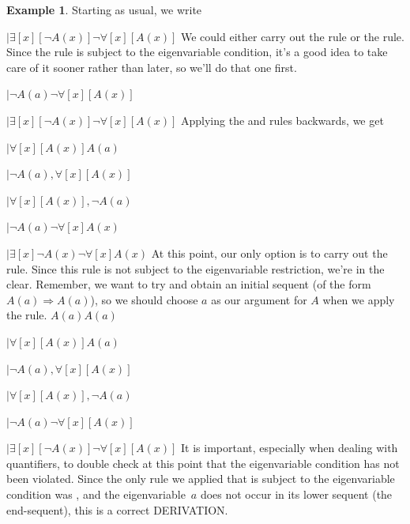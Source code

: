 \documentclass[10pt,a4paper]{article}
\newcommand*{\olup}[1]{\MakeUppercase{#1}}
\theoremstyle{plain}
\theoremstyle{definition}
\newtheorem{ex}[thm]{Example}
\theoremstyle{remark}
\providecommand{\AxiomC}[1]{}
\providecommand{\RightLabel}[1]{}
\providecommand{\fCenter}{}
\newenvironment{prooftree}{}{}
\providecommand{\lforall}{\mathord{\forall}}
\providecommand{\lexists}{\mathord{\exists}}
\providecommand{\Sequent}{\mathrel{\Rightarrow}}
\providecommand{\LeftR}[1]{}
\providecommand{\RightR}[1]{}
\providecommand{\UnaryInf}{\ensuremath{\mid}}
\providecommand{\RightR}{\mathrm{R}}
\providecommand{\LeftR}{\mathrm{L}}
\providecommand{\Axiom}{\mathrm{Ax}}
\begin{document}
\begin{ex}
Starting as usual, we write
\begin{prooftree}
\AxiomC{}
\UnaryInf$\lexists[x][\lnot A(x)] \fCenter \lnot \lforall[x][A(x)]$
\end{prooftree}
We could either carry out the \LeftR{\exists} rule or the \RightR{\lnot}
rule. Since the \LeftR{\exists} rule is subject to the eigenvariable
condition, it's a good idea to take care of it sooner rather than
later, so we'll do that one first.
\begin{prooftree}
\AxiomC{}
\UnaryInf$ \lnot A(a) \fCenter \lnot \lforall[x][A(x)]$
\RightLabel{\LeftR{\lexists}}
\UnaryInf$ \lexists[x][\lnot A(x)] \fCenter \lnot \lforall[x][A(x)]$
\end{prooftree}
Applying the \LeftR{\lnot} and \RightR{\lnot} rules backwards, we get
\begin{prooftree}
\AxiomC{}
\UnaryInf$\lforall[x][A(x)] \fCenter A(a)$
\RightLabel{\LeftR{\lnot}}
\UnaryInf$\lnot A(a), \lforall[x][A(x)] \fCenter $
\RightLabel{\LeftR{\Exchange}}
\UnaryInf$\lforall[x][A(x)], \lnot A(a) \fCenter $
\RightLabel{\RightR{\lnot}}
\UnaryInf$ \lnot A(a) \fCenter \lnot \lforall[x] A(x)$
\RightLabel{\LeftR{\lexists}}
\UnaryInf$ \lexists[x] \lnot A(x) \fCenter \lnot \lforall[x] A(x)$
\end{prooftree}
At this point, our only option is to carry out the \LeftR{\forall}
rule. Since this rule is not subject to the eigenvariable restriction,
we're in the clear. Remember, we want to try and obtain an initial
sequent (of the form $A(a) \Sequent A(a)$), so we should choose $a$
as our argument for $A$ when we apply the rule.
\begin{prooftree}
\Axiom$A(a) \fCenter A(a)$
\RightLabel{\LeftR{\lforall}}
\UnaryInf$\lforall[x][A(x)] \fCenter A(a)$
\RightLabel{\LeftR{\lnot}}
\UnaryInf$\lnot A(a), \lforall[x][A(x)] \fCenter $
\RightLabel{\LeftR{\Exchange}}
\UnaryInf$\lforall[x][A(x)], \lnot A(a) \fCenter $
\RightLabel{\RightR{\lnot}}
\UnaryInf$ \lnot A(a) \fCenter \lnot \lforall[x][A(x)]$
\RightLabel{\LeftR{\lexists}}
\UnaryInf$ \lexists[x][ \lnot A(x)] \fCenter \lnot \lforall[x][A(x)]$
\end{prooftree}
It is important, especially when dealing with quantifiers, to double
check at this point that the eigenvariable condition has not been
violated. Since the only rule we applied that is subject to the
eigenvariable condition was \LeftR{\exists}, and the eigenvariable~$a$
does not occur in its lower sequent (the end-sequent), this is a
correct \olup{derivation}.
\end{ex}
\end{document}
